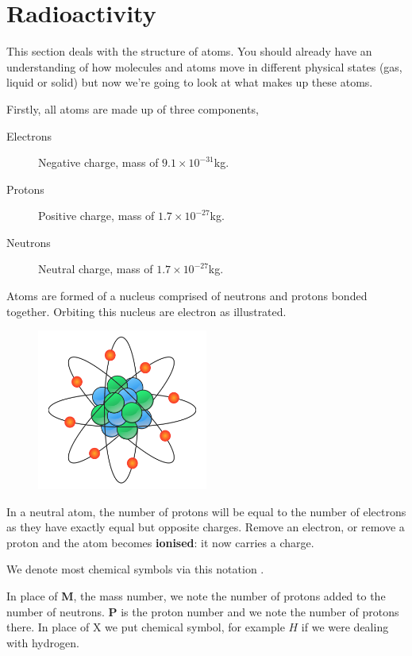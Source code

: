 \documentclass[11pt, titlepage]{article}
\begin{document}
\section{Radioactivity}
This section deals with the structure of atoms.  You should already have an understanding of how molecules and atoms move in different physical states (gas, liquid or solid) but now we're going to look at what makes up these atoms.

Firstly, all atoms are made up of three components,
\begin{description}
\item[Electrons] Negative charge, mass of $9.1\times10^{-31}$kg.
\item[Protons] Positive charge, mass of $1.7\times10^{-27}$kg.
\item[Neutrons] Neutral charge, mass of  $1.7\times10^{-27}$kg.
\end{description}

Atoms are formed of a nucleus comprised of neutrons and protons bonded together.  Orbiting this nucleus are electron as illustrated.  
\begin{figure}[H]
\centering
\includegraphics[width=0.5\textwidth]{atom}
\end{figure}


In a neutral atom, the number of protons will be equal to the number of electrons as they have exactly equal but opposite charges.  Remove an electron, or remove a proton and the atom becomes \textbf{ionised}: it now carries a charge.

We denote most chemical symbols via this notation
{\Large{}}.

In place of \textbf{M}, the mass number, we note the number of protons added to the number of neutrons.  \textbf{P} is the proton number and we note the number of protons there.  In place of X we put chemical symbol, for example $H$ if we were dealing with hydrogen.
\end{document}
